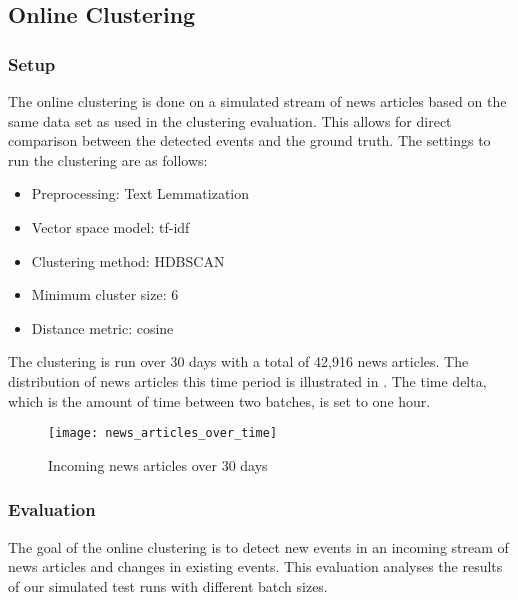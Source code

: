 \subsection{Online Clustering}
\label{subsec:5b_online_clustering}

\subsubsection{Setup}
\label{subsubsec:5b_setup}

The online clustering is done on a simulated stream of news articles
based on the same data set as used in the clustering evaluation.
This allows for direct comparison between the detected events and the ground truth.
The settings to run the clustering are as follows:

\begin{itemize}
    \item Preprocessing: Text Lemmatization
    \item Vector space model: tf-idf
    \item Clustering method: HDBSCAN
    \item Minimum cluster size: 6
    \item Distance metric: cosine
\end{itemize}

The clustering is run over 30 days with a total of 42,916 news articles.
The distribution of news articles this time period is illustrated in .
The time delta, which is the amount of time between two batches, is set to one hour.

\begin{figure}[h]
    \centering
    \texttt{[image: news\_articles\_over\_time]}
    \caption{Incoming news articles over 30 days}
    \label{fig:news_articles_over_time}
\end{figure}

\subsubsection{Evaluation}
\label{subsubsec:5b_evaluation}

The goal of the online clustering is to detect new events in an incoming stream
of news articles and changes in existing events.
This evaluation analyses the results of our simulated test runs with different batch sizes.

